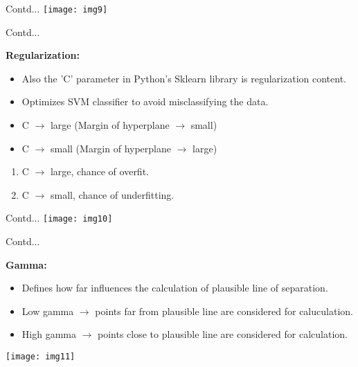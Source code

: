 \documentclass{beamer}
\newcommand\myheading[1]{%
  \par\bigskip
  {\large\bfseries#1}\par\smallskip}
\begin{document}
\begin{frame}{Contd...}
	\texttt{[image: img9]}
\end{frame}

\begin{frame}{Contd...}
	\begin{flushleft}
	\myheading{Regularization:}
	\begin{itemize}
		\item Also the 'C' parameter in Python's Sklearn library is regularization content.
		\item Optimizes SVM classifier to avoid misclassifying the data.
		\item C $\rightarrow$ large (Margin of hyperplane $\rightarrow$ small)
		\item C $\rightarrow$ small (Margin of hyperplane $\rightarrow$ large)
	\end{itemize}
	\begin{enumerate}
		\item C $\rightarrow$ large, chance of overfit.
		\item C $\rightarrow$ small, chance of underfitting. 
	\end{enumerate}
	\end{flushleft}
\end{frame}

\begin{frame}{Contd...}
	\texttt{[image: img10]}
\end{frame}

\begin{frame}{Contd...}
	\begin{flushleft}
		\myheading{Gamma:}
		\begin{itemize}
			\item Defines how far influences the calculation of plausible line of separation.
			\item Low gamma $\rightarrow$ points far from plausible line are considered for caluculation.
			\item High gamma $\rightarrow$ points close to plausible line are considered for calculation.
		\end{itemize}
	\end{flushleft}
	\texttt{[image: img11]}
\end{frame}
\end{document}
